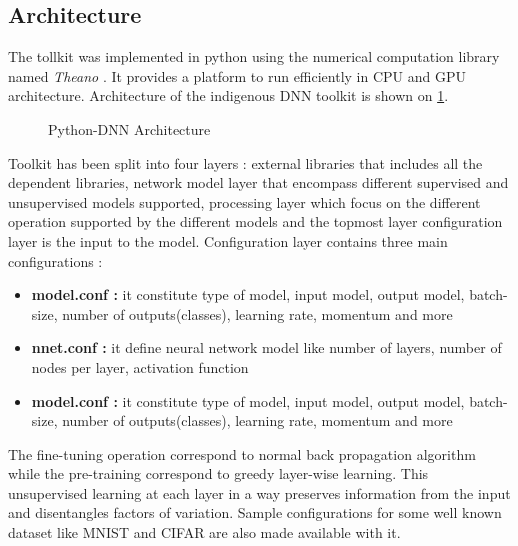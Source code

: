 \subsection{Architecture}
The tollkit was implemented in python using the numerical computation library named \textit{Theano} \citep{theano}.  It provides a platform to run efficiently in CPU and GPU architecture.  Architecture of the indigenous DNN toolkit is shown on \ref{fig:architecture}.
\begin{figure}[htpb]
   \begin{center}
   		{%
			\setlength{\fboxsep}{5pt}%
			\setlength{\fboxrule}{1pt}%
	    }%
     \caption {Python-DNN Architecture}
	 \label{fig:architecture}
   \end{center}
 \end{figure}
Toolkit has been split into four layers : external libraries that includes all the dependent libraries, network model layer that encompass different supervised and unsupervised models supported, processing layer which focus on the different operation supported by the different models and the topmost layer configuration layer is the input to the model.  Configuration layer contains three main configurations : 
 \begin{itemize}
	\item {\textbf{model.conf :} it constitute type of model, input model, output model, batch-size, number of outputs(classes), learning rate, momentum and more}
	\item {\textbf{nnet.conf :} it define neural network model like number of layers, number of nodes per layer, activation function}
	\item {\textbf{model.conf :} it constitute type of model, input model, output model, batch-size, number of outputs(classes), learning rate, momentum and more}
 \end{itemize}
The fine-tuning operation correspond to normal back propagation algorithm while the pre-training correspond to greedy layer-wise learning.  This unsupervised learning at each layer in a way preserves information from the input and disentangles factors of variation.  Sample configurations for some well known dataset like MNIST and CIFAR are also made available with it.
